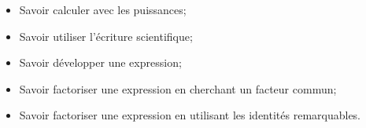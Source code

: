 \begin{acquis}
\begin{itemize}
\item Savoir calculer avec les puissances;
\item Savoir utiliser l'écriture scientifique;
\item Savoir développer une expression;
\item Savoir factoriser une expression en cherchant un facteur commun;
\item Savoir factoriser une expression en utilisant les identités remarquables.
\end{itemize}
\end{acquis}



